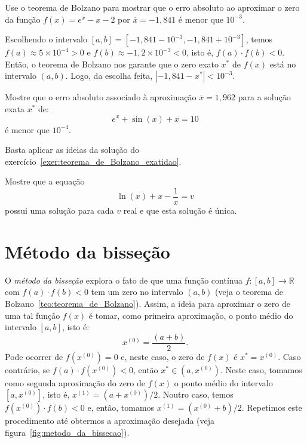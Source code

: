 \begin{exer}\label{exer:teorema_de_Bolzano_exatidao} Use o teorema de Bolzano para mostrar que o erro absoluto ao aproximar o zero da função $f(x)=e^x-x-2$ por $\overline{x}=-1,841$ é menor que $10^{-3}$.
\end{exer}
\begin{resp}
  
    Escolhendo o intervalo $[a, b] = [-1,841-10^{-3}, -1,841+10^{-3}]$, temos $f(a)\approx 5\times 10^{-4} > 0$ e $f(b)\approx -1,2\times 10^{-3} < 0$, isto é, $f(a)\cdot f(b) < 0$. Então, o teorema de Bolzano nos garante que o zero exato $x^*$ de $f(x)$ está no intervalo $(a, b)$. Logo, da escolha feita, $|-1,841 - x^*| < 10^{-3}$.
  
\end{resp}

\begin{exer} Mostre que o erro absoluto associado à aproximação $\overline{x} = 1,962$ para a solução exata $x^*$ de:
  \begin{equation*}
    e^x+\sin (x) +x = 10  
  \end{equation*}
é menor que $10^{-4}$.
\end{exer}
\begin{resp}
  Basta aplicar as ideias da solução do exercício~\ref{exer:teorema_de_Bolzano_exatidao}.
\end{resp}

\begin{exer}\label{existe_unica} Mostre que a equação
  \begin{equation*}
    \ln(x)+x-\frac{1}{x}=v
  \end{equation*}
possui uma solução para cada $v$ real e que esta solução é única.
\end{exer}

\section{Método da bisseção}

O \emph{método da bisseção} explora o fato de que uma função contínua $f:[a, b]\to \mathbb{R}$ com $f(a)\cdot f(b) < 0$ tem um zero no intervalo $(a, b)$ (veja o teorema de Bolzano~\ref{teo:teorema_de_Bolzano}). Assim, a ideia para aproximar o zero de uma tal função $f(x)$ é tomar, como primeira aproximação, o ponto médio do intervalo $[a, b]$, isto é:
\begin{equation*}
  x^{(0)} = \frac{(a + b)}{2}. 
\end{equation*}
Pode ocorrer de $f(x^{(0)}) = 0$ e, neste caso, o zero de $f(x)$ é $x^* = x^{(0)}$. Caso contrário, se $f(a)\cdot f(x^{(0)}) < 0$, então $x^*\in (a, x^{(0)})$. Neste caso, tomamos como segunda aproximação do zero de $f(x)$ o ponto médio do intervalo $[a, x^{(0)}]$, isto é, $x^{(1)} = (a + x^{(0)})/2$. Noutro caso, temos $f(x^{(0)})\cdot f(b) < 0$ e, então, tomamos $x^{(1)} = (x^{(0)} + b)/2$. Repetimos este procedimento até obtermos a aproximação desejada (veja figura~\ref{fig:metodo_da_bissecao}).
 

